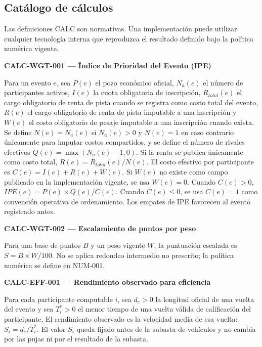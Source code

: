 \documentclass[10pt,letterpaper]{article}
\begin{document}
\subsection{Catálogo de cálculos}
Las definiciones CALC son normativas. Una implementación puede utilizar cualquier tecnología interna que reproduzca el resultado definido bajo la política numérica vigente.

\noindent\textbf{CALC-WGT-001 --- Índice de Prioridad del Evento (IPE)}\par
Para un evento $e$, sea $P(e)$ el pozo económico oficial, $N_a(e)$ el número de participantes activos, $I(e)$ la cuota obligatoria de inscripción, $R_{total}(e)$ el cargo obligatorio de renta de pista cuando se registra como costo total del evento, $R(e)$ el cargo obligatorio de renta de pista imputable a una inscripción y $W(e)$ el costo obligatorio de pesaje imputable a una inscripción cuando exista. Se define $N(e)=N_a(e)$ si $N_a(e)>0$ y $N(e)=1$ en caso contrario únicamente para imputar costos compartidos, y se define el número de rivales efectivos $Q(e)=\max(N_a(e)-1,0)$. Si la renta se publica únicamente como costo total, $R(e)=R_{total}(e)/N(e)$. El costo efectivo por participante es $C(e)=I(e)+R(e)+W(e)$. Si $W(e)$ no existe como campo publicado en la implementación vigente, se usa $W(e)=0$. Cuando $C(e)>0$, $IPE(e)=P(e)\times Q(e)/C(e)$. Cuando $C(e)\le0$, se usa $C(e)=1$ como convención operativa de ordenamiento. Los empates de IPE favorecen al evento registrado antes.\par\vspace{0.5em}
\noindent\textbf{CALC-WGT-002 --- Escalamiento de puntos por peso}\par
Para una base de puntos $B$ y un peso vigente $W$, la puntuación escalada es $S=B\times W/100$. No se aplica redondeo intermedio no prescrito; la política numérica se define en NUM-001.\par\vspace{0.5em}
\noindent\textbf{CALC-EFF-001 --- Rendimiento observado para eficiencia}\par
Para cada participante computable $i$, sea $d_e>0$ la longitud oficial de una vuelta del evento y sea $T_i^*>0$ el menor tiempo de una vuelta válida de calificación del participante. El rendimiento observado es la velocidad media de esa vuelta: $S_i=d_e/T_i^*$. El valor $S_i$ queda fijado antes de la subasta de vehículos y no cambia por las pujas ni por el resultado de la subasta.\par\vspace{0.5em}
\end{document}
